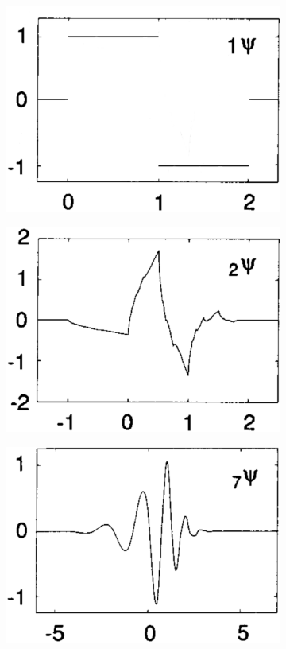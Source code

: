 {\begin{figure}
   \begin{subfigure}{0.32\textwidth}
   \includegraphics[width=\textwidth]{Figures/Daubechies1}
   \end{subfigure}
   \begin{subfigure}{0.32\textwidth}
   \includegraphics[width=\textwidth]{Figures/Daubechies2}
   \end{subfigure}
   \begin{subfigure}{0.32\textwidth}
   \includegraphics[width=\textwidth]{Figures/Daubechies7}

\end{subfigure}
\end{figure}}
